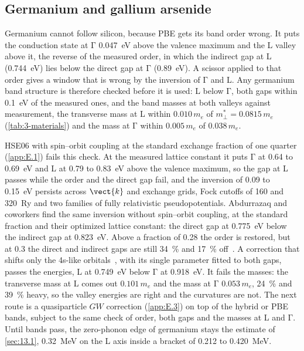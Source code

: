 \subsection{Germanium and gallium arsenide}

Germanium cannot follow silicon, because PBE gets its band order wrong. It puts the conduction state at $\mathrm{\Gamma}$ \SI{0.047}{eV} above the valence maximum and the L valley above it, the reverse of the measured order, in which the indirect gap at L (\SI{0.744}{eV}) lies below the direct gap at $\mathrm{\Gamma}$ (\SI{0.89}{eV}). A scissor applied to that order gives a window that is wrong by the inversion of $\mathrm{\Gamma}$ and L. Any germanium band structure is therefore checked before it is used: L below $\mathrm{\Gamma}$, both gaps within \SI{0.1}{eV} of the measured ones, and the band masses at both valleys against measurement, the transverse mass at L within $0.010\,m_e$ of $m^*_\perp = 0.0815\,m_e$ (\cref{tab:3-materials}) and the mass at $\mathrm{\Gamma}$ within $0.005\,m_e$ of $0.038\,m_e$.

HSE06 with spin--orbit coupling at the standard exchange fraction of one quarter (\cref{app:E.1}) fails this check. At the measured lattice constant it puts $\mathrm{\Gamma}$ at 0.64 to \SI{0.69}{eV} and L at 0.79 to \SI{0.83}{eV} above the valence maximum, so the gap at L passes while the order and the direct gap fail, and the inversion of 0.09 to \SI{0.15}{eV} persists across $\vect{k}$ and exchange grids, Fock cutoffs of 160 and \SI{320}{Ry} and two families of fully relativistic pseudopotentials. Abdurrazaq and coworkers find the same inversion without spin--orbit coupling, at the standard fraction and their optimized lattice constant: the direct gap at \SI{0.775}{eV} below the indirect gap at \SI{0.823}{eV}. Above a fraction of 0.28 the order is restored, but at 0.3 the direct and indirect gaps are still \SI{34}{\percent} and \SI{17}{\percent} off~\cite[Fig.~1(a)]{abdurrazaq2025accurate}. A correction that shifts only the 4s-like orbitals~\cite{abdurrazaq2025accurate}, with its single parameter fitted to both gaps, passes the energies, L at \SI{0.749}{eV} below $\mathrm{\Gamma}$ at \SI{0.918}{eV}. It fails the masses: the transverse mass at L comes out $0.101\,m_e$ and the mass at $\mathrm{\Gamma}$ $0.053\,m_e$, \SI{24}{\percent} and \SI{39}{\percent} heavy, so the valley energies are right and the curvatures are not. The next route is a quasiparticle $GW$ correction (\cref{app:E.3}) on top of the hybrid or PBE bands, subject to the same check of order, both gaps and the masses at L and $\mathrm{\Gamma}$. Until bands pass, the zero-phonon edge of germanium stays the estimate of \cref{sec:13.1}, \SI{0.32}{MeV} on the L axis inside a bracket of 0.212 to \SI{0.420}{MeV}.

